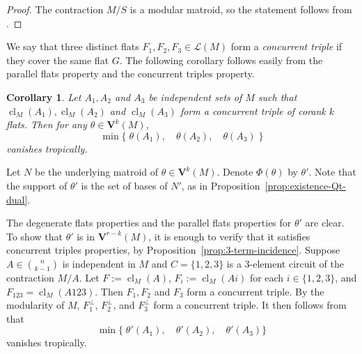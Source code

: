 \documentclass{article}
\newtheorem{corollary}[theorem]{Corollary}
\theoremstyle{definition}
\newcommand{\cl}{\operatorname{cl}}
\newcommand{\nk}[2]{\binom{#1}{#2}}
\newcommand{\cLL}{\mathcal{L}}
\newcommand{\bV}{\mathbf V}
\begin{document}
\begin{proof}
The contraction $M/S$ is a modular matroid, so the statement follows from .
\end{proof}

We say that three distinct flats $F_1,F_2,F_3\in \cLL(M)$ form a \textit{concurrent triple} if they cover the same flat $G$. The following corollary follows easily from the parallel flats property and the concurrent triples property.

\begin{corollary}\label{cor:concurrent-triple}
    Let $A_1,A_2$ and $A_3$ be independent sets of $M$ such that $\cl_M(A_1),\cl_M(A_2)$ and $\cl_M(A_3)$ form a concurrent triple of corank $k$ flats. Then for any $\theta\in \bV^k(M)$,
    \begin{equation}
            \min\{\;\theta(A_1),\quad \theta(A_2), \quad \theta(A_3)\;\}
        \end{equation}
        vanishes tropically.
\end{corollary}


Let $N$ be the underlying matroid of $\theta \in \bV^k(M)$. Denote $\Phi(\theta)$ by $\theta'$. Note that the support of $\theta'$ is the set of bases of $N'$, as in Proposition~\ref{prop:existence-Qt-dual}. 

The degenerate flats properties and the parallel flats properties for $\theta'$ are clear. To show that $\theta'$ is in $\bV^{r-k}(M)$, it is enough to verify that it satisfies  concurrent triples properties, by Proposition~\ref{prop:3-term-incidence}.   Suppose $A\in \nk{n}{k-1}$ is independent in $M$ and $C=\{1,2,3\}$ is a 3-element circuit of the contraction $M/A$. Let $F:=\cl_M(A)$, $F_i:=\cl_M(Ai)$ for each $i\in\{1,2,3\}$, and $F_{123}=\cl_M(A123)$. Then $F_1,F_2$ and $F_3$ form a concurrent triple. By the modularity of $M$, $F_1^\perp$, $F_2^\perp$,  and $F_3^\perp$ form a concurrent triple. It then follows from  that
        \[\min\{\;\theta' (A_1),\quad \theta' (A_2),\quad \theta' (A_3)\}\]
        vanishes tropically.
        
\end{document}
